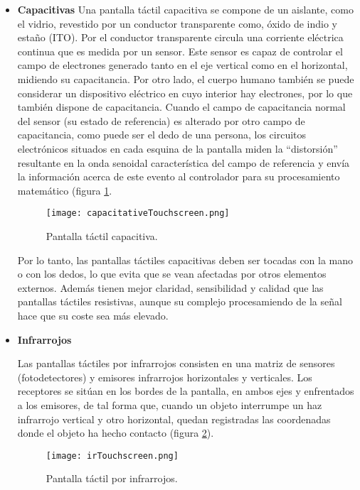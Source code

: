 \begin{itemize}
\item \textbf{Capacitivas}
Una pantalla táctil capacitiva se compone de un aislante, como el vidrio, 
revestido por un conductor transparente como, óxido de indio y estaño (ITO).
Por el conductor transparente circula una corriente eléctrica continua
que es medida por un sensor. Este sensor es capaz de controlar el campo de
electrones generado tanto en el eje vertical como en el horizontal, midiendo
su capacitancia. Por otro lado, el cuerpo humano también se puede considerar un 
dispositivo eléctrico en cuyo interior hay electrones, por lo que también 
dispone de capacitancia. Cuando el campo de capacitancia normal del sensor (su 
estado de referencia) es alterado por otro campo de capacitancia, como puede 
ser el dedo de una persona, los circuitos electrónicos situados en cada esquina 
de la pantalla miden la ``distorsión'' resultante en la onda senoidal 
característica del campo de referencia y envía la información acerca de este 
evento al controlador para su procesamiento matemático (figura
\ref{fig:capacitativeTouchscreen}.

  \begin{figure}[H]
    \begin{center}
      \texttt{[image: capacitativeTouchscreen.png]}
      \caption{Pantalla táctil capacitiva.}
      \label{fig:capacitativeTouchscreen}
    \end{center}
  \end{figure}

Por lo tanto, las pantallas táctiles capacitivas deben ser tocadas con la
mano o con los dedos, lo que evita que se vean afectadas por otros elementos
externos. Además tienen mejor claridad, sensibilidad y calidad que las
pantallas táctiles resistivas, aunque su complejo procesamiendo de la señal
hace que su coste sea más elevado.

\item \textbf{Infrarrojos}

Las pantallas táctiles por infrarrojos consisten en una matriz de sensores
(fotodetectores) y emisores infrarrojos horizontales y verticales. Los 
receptores se sitúan en los bordes de la pantalla, en ambos ejes y enfrentados
a los emisores, de tal forma que, cuando un objeto interrumpe un haz
infrarrojo vertical y otro horizontal, quedan registradas las coordenadas
donde el objeto ha hecho contacto (figura \ref{fig:irTouchscreen}).

  \begin{figure}[H]
    \begin{center}
      \texttt{[image: irTouchscreen.png]}
      \caption{Pantalla táctil por infrarrojos.}
      \label{fig:irTouchscreen}
    \end{center}
  \end{figure}


\end{itemize}
